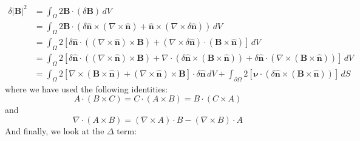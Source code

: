 \documentclass[reqno]{article}
\newcommand{\n}{\hat{\mathbf{n}}}
\begin{document}
\begin{equation}
\begin{split}
    \delta \left|\mathbf{B}\right|^2
    &=
    \int_{\Omega} 2 \mathbf{B} \cdot \left(\delta \mathbf{B}\right) \, dV \\
    &=
    \int_{\Omega} 2 \mathbf{B} \cdot \left(
        \delta \n \times \left(\nabla \times \n\right)
        + \n \times\left( \nabla \times \delta \n \right)
    \right) \, dV \\
    &=
    \int_{\Omega} 2 \left[ 
        \delta \n \cdot \left( \left( \nabla \times \n \right) \times \mathbf{B}\right)
        + \left(\nabla \times \delta \n \right) \cdot \left(\mathbf{B} \times \n \right)
    \right] \, dV \\
    &=
    \int_{\Omega} 2 \left[ 
        \delta \n \cdot \left( \left( \nabla \times \n \right) \times \mathbf{B}\right)
        + \nabla \cdot \left( \delta \n \times \left( \mathbf{B} \times \n \right) \right)
        + \delta \n \cdot \left( \nabla \times \left( \mathbf{B} \times \n \right) \right)
    \right]  \, dV \\
    &=
    \int_{\Omega} 2 \left[ 
        \nabla \times \left( \mathbf{B} \times \n \right)
        + \left(\nabla \times \n \right) \times \mathbf{B}
    \right] \cdot \delta \n \, dV
    +
    \int_{\partial \Omega} 2 \left[
        \boldsymbol\nu \cdot \left( \delta \n \times \left( \mathbf{B} \times \n \right) \right)
    \right] \, dS
\end{split}
\end{equation}
where we have used the following identities:
\begin{equation}
    A \cdot (B \times C)
    =
    C \cdot (A \times B)
    =
    B \cdot (C \times A)
\end{equation}
and
\begin{equation}
    \nabla \cdot (A \times B)
    =
    (\nabla \times A) \cdot B
    - (\nabla \times B) \cdot A
\end{equation}
And finally, we look at the $\Delta$ term:
\end{document}
